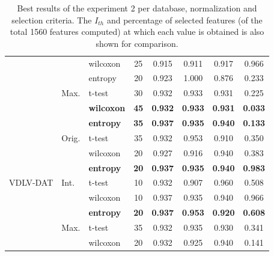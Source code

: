 \begin{table}[htp]
\begin{tabular}{lllccccc}
	                          &                        & wilcoxon  &    25    & 0.915 & 0.911 & 0.917 & 0.966 \\ \cline{2-8}
	                          & \multirow{3}{*}{Max.}  & entropy   &    20    & 0.923 & 1.000 & 0.876 & 0.233 \\
	                          &                        & t-test    &    30    & 0.932 & 0.933 & 0.931 & 0.225 \\
	                          &                        & \textbf{wilcoxon}  &    \textbf{45}    & \textbf{0.932} & \textbf{0.933} & \textbf{0.931} & \textbf{0.033} \\ \midrule
	\multirow{9}{*}{VDLV-DAT} & \multirow{3}{*}{Orig.} & \textbf{entropy}   &    \textbf{35}    & \textbf{0.937} & \textbf{0.935} & \textbf{0.940} & \textbf{0.133 }\\
	                          &                        & t-test    &    35    & 0.932 & 0.953 & 0.910 & 0.350 \\
	                          &                        & wilcoxon  &    20    & 0.927 & 0.916 & 0.940 & 0.383 \\ \cline{2-8}
	                          & \multirow{3}{*}{Int.}  & \textbf{entropy}   &    \textbf{20}    & \textbf{0.937} & \textbf{0.935} & \textbf{0.940} & \textbf{0.983} \\
	                          &                        & t-test    &    10    & 0.932 & 0.907 & 0.960 & 0.508 \\
	                          &                        & wilcoxon  &    10    & 0.937 & 0.935 & 0.940 & 0.966 \\ \cline{2-8}
	                          & \multirow{3}{*}{Max.}  & \textbf{entropy}   &    \textbf{20}    & \textbf{0.937} & \textbf{0.953} & \textbf{0.920} & \textbf{0.608} \\
	                          &                        & t-test    &    35    & 0.932 & 0.935 & 0.930 & 0.341 \\
	                          &                        & wilcoxon  &    20    & 0.932 & 0.925 & 0.940 & 0.141 \\ \bottomrule
\end{tabular}
	\caption[Best results of the experiment 2 per database, normalization and selection criteria.]{Best results of the experiment 2 per database, normalization and selection criteria. The $I_{th}$ and percentage of selected features (of the total 1560 features computed) at which each value is obtained is also shown for comparison. }
	\label{tab:exp3Res}
\end{table}

